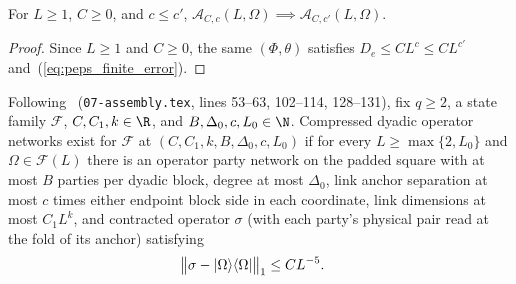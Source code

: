 \begin{lemma}
    \label{thm:peps_exponent_monotone}
    \leanok
    For $L\ge1$, $C\ge0$, and $c\le c'$,
    $\mathcal A_{C,c}(L,\Omega)\implies\mathcal A_{C,c'}(L,\Omega)$.
\end{lemma}
\begin{proof}
    \leanok
    Since $L\ge1$ and $C\ge0$, the same $(\Phi,\theta)$ satisfies
    $D_e\le CL^c\le CL^{c'}$ and~(\ref{eq:peps_finite_error}).
\end{proof}

\begin{definition}
    \label{def:peps_large_size_dyadic_operator_network}
    \leanok
    Following~\cite[Section~8.1, Proposition~7.1, and Lemma~8.2]{OpenAI2026PolynomialPEPS}
    (\texttt{07-assembly.tex}, lines 53--63, 102--114, 128--131), fix $q\ge2$,
    a state family $\mathcal F$, $C,C_1,k\in\R$, and
    $B,\Delta_0,c,L_0\in\N$. Compressed dyadic operator networks exist for
    $\mathcal F$ at $(C,C_1,k,B,\Delta_0,c,L_0)$ if for every
    $L\ge\max\{2,L_0\}$ and $\Omega\in\mathcal F(L)$ there is an operator
    party network on the padded square with at most $B$ parties per dyadic
    block, degree at most $\Delta_0$, link anchor separation at most $c$ times
    either endpoint block side in each coordinate, link dimensions at most
    $C_1L^k$, and contracted operator $\sigma$ (with each party's physical
    pair read at the fold of its anchor) satisfying
    \begin{align}
        \bigl\lVert\sigma-|\Omega\rangle\langle\Omega|\bigr\rVert_1
         & \le CL^{-5}. \notag
    \end{align}
\end{definition}

